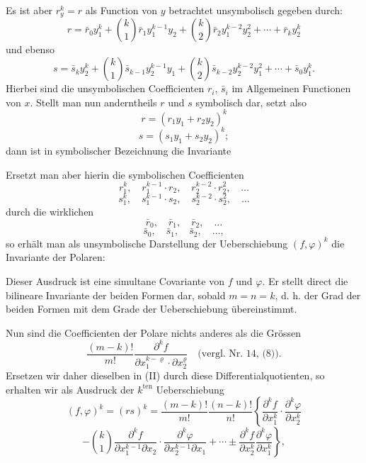 
Es ist aber $r_y^k = r$ als Function von $y$ betrachtet unsymbolisch
gegeben durch:
\[
r = \bar r_0 y_1^k + \binom{k}{1} \bar r_1 y_1^{k-1} y_2 + \binom{k}{2} \bar r_2 y_1^{k-2} y_2^2 + \cdots + \bar r_k y_2^k
\]
und ebenso
\[
s = \bar s_k y_2^k + \binom{k}{1} \bar s_{k-1} y_2^{k-1} y_1 + \binom{k}{2} \bar s_{k-2} y_2^{k-2} y_1^2 + \cdots + \bar s_0 y_1^k.
\]
Hierbei sind die unsymbolischen Coefficienten $r_i$, $\bar s_i$ im
Allgemeinen Functionen von $x$. Stellt man nun anderntheils $r$ und $s$
symbolisch dar, setzt also
\[
r = (r_1 y_1 + r_2 y_2)^k
\]
\[
s = (s_1 y_1 + s_2 y_2)^k;
\]
dann ist in symbolischer Bezeichnung die Invariante


Ersetzt man aber hierin die symbolischen Coefficienten
\[
r_1^k, \quad r_1^{k-1} \cdot r_2, \quad r_2^{k-2} \cdot r_2^2, \quad \ldots %
\]
\[
s_1^k, \quad s_1^{k-1} \cdot s_2, \quad s_2^{k-2} \cdot s_2^2, \quad \ldots
\]
durch die wirklichen
\[
\bar r_0, \quad \bar r_1, \quad \bar r_2, \quad \ldots
\]
\[
\bar s_0, \quad \bar s_1, \quad \bar s_2, \quad \ldots,
\]
so erhält man als unsymbolische Darstellung der Ueberschiebung
$(f, \varphi)^k$ die Invariante der Polaren:


Dieser Ausdruck ist eine simultane Covariante von $f$ und $\varphi$. Er
stellt direct die bilineare Invariante der beiden Formen dar, sobald
$m = n = k$, d. h. der Grad der beiden Formen mit dem Grade der
Ueberschiebung übereinstimmt.

Nun sind die Coefficienten der Polare nichts anderes als die Grössen
\[
\frac{(m-k)!}{m!} \frac{\partial^k f}{\partial x_1^{k-\varrho} \cdot \partial x_2^\varrho} \quad \text{(vergl. Nr. 14, (8)).}
\]
Ersetzen wir daher dieselben in (II) durch diese Differentialquotienten,
so erhalten wir als Ausdruck der $k^{\text{ten}}$ Ueberschiebung
\[
(f, \varphi)^k = (rs)^k = \frac{(m-k)!}{m!} \frac{(n-k)!}{n!} \left\{ \frac{\partial^k f}{\partial x_1^k} \cdot \frac{\partial^k \varphi}{\partial x_2^k} \right.
\]
\[
\left. - \binom{k}{1} \frac{\partial^k f}{\partial x_1^{k-1} \partial x_2} \cdot \frac{\partial^k \varphi}{\partial x_2^{k-1} \partial x_1} + \cdots \pm \frac{\partial^k f}{\partial x_2^k} \frac{\partial^k \varphi}{\partial x_1^k} \right\},
\]


